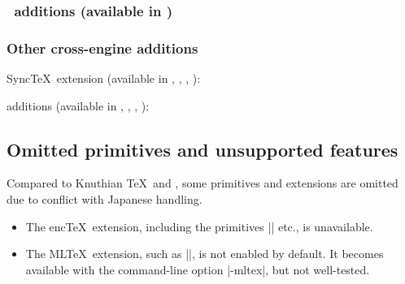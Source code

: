 \documentclass[a4paper,11pt,dvipdfmx]{article}
\begin{document}
\subsubsection{\eupTeX\ additions (available in \eupTeX)}
\begin{simplelist}
\end{simplelist}

\subsubsection{Other cross-engine additions}
Sync\TeX\ extension (available in \pTeX, \upTeX, \epTeX, \eupTeX):
\begin{simplelist}
 \csitem[\.{synctex}]
\end{simplelist}

\noindent
\TL additions (available in \pTeX, \upTeX, \epTeX, \eupTeX):
\begin{simplelist}
\end{simplelist}


\subsection{Omitted primitives and unsupported features}

Compared to Knuthian \TeX\ and \eTeX, some primitives and extensions are
omitted due to conflict with Japanese handling.
\begin{itemize}
 \item The enc\TeX\ extension, including the primitives |\mubyte| etc.,
  is unavailable.
 \item The ML\TeX\ extension, such as |\charsubdef|, is not enabled
  by default. It becomes available with the command-line option |-mltex|,
  but not well-tested.
\end{itemize}


\end{document}
